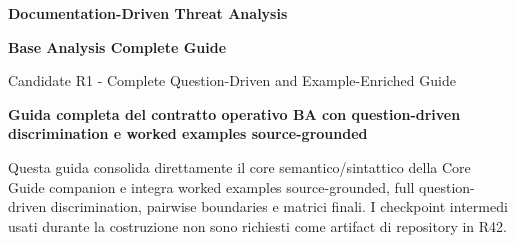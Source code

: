 \documentclass[11pt,a4paper]{article}
\begin{document}

\begin{titlepage}
\thispagestyle{empty}
\vspace*{8mm}
{\sffamily\bfseries\color{DDTANavy}\fontsize{15}{18}\selectfont Documentation-Driven Threat Analysis}\par
\vspace{5mm}
{\sffamily\bfseries\color{DDTANavy}\fontsize{29}{33}\selectfont Base Analysis Complete Guide}\par
\vspace{2mm}
{\sffamily\color{DDTABlue}\fontsize{18}{22}\selectfont Candidate R1 - Complete Question-Driven and Example-Enriched Guide}\par

\vspace{9mm}
\begin{tcolorbox}[enhanced,arc=3pt,boxrule=0pt,colback=DDTANavy,left=12pt,right=12pt,top=11pt,bottom=11pt]
{\color{white}\sffamily\bfseries\large Guida completa del contratto operativo BA con question-driven discrimination e worked examples source-grounded}\par
\vspace{2mm}
{\color{white!88}\small Questa guida consolida direttamente il core semantico/sintattico della Core Guide companion e integra worked examples source-grounded, full question-driven discrimination, pairwise boundaries e matrici finali. I checkpoint intermedi usati durante la costruzione non sono richiesti come artifact di repository in R42.}
\end{tcolorbox}


\end{titlepage}
\end{document}
